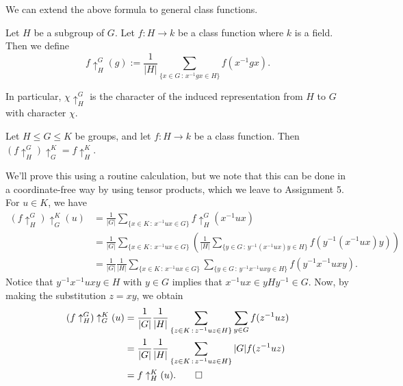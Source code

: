 We can extend the above formula to general class functions. 

\begin{defn}{}
    Let $H$ be a subgroup of $G$. Let $f : H \to k$ be a class function 
    where $k$ is a field. Then we define 
    \[ f \uparrow_H^G(g) := \frac{1}{|H|} \sum_{\{x\in G\,:\,x^{-1}gx \in H\}} 
    f(x^{-1}gx). \] 
\end{defn}

In particular, $\chi \uparrow_H^G$ is the character of the induced representation
from $H$ to $G$ with character $\chi$. 

\begin{prop}{}
    Let $H \leq G \leq K$ be groups, and let $f : H \to k$ be a class function. 
    Then $(f \uparrow_H^G) \uparrow_G^K = f \uparrow_H^K$. 
\end{prop}
\begin{pf}
    We'll prove this using a routine calculation, but we note that this can be 
    done in a coordinate-free way by using tensor products, which we leave 
    to Assignment 5. For $u \in K$, we have 
    \begin{align*}
        (f \uparrow_H^G) \uparrow_G^K(u)
        &= \frac{1}{|G|} \sum_{\{x\in K\,:\,x^{-1}ux\in G\}} f \uparrow_H^G (x^{-1}ux) \\ 
        &= \frac{1}{|G|} \sum_{\{x\in K\,:\,x^{-1}ux\in G\}} \left( 
        \frac{1}{|H|} \sum_{\{y\in G\,:\,y^{-1}(x^{-1}ux)y\in H\}} f(y^{-1}(x^{-1}ux)y) \right) \\ 
        &= \frac{1}{|G|} \frac{1}{|H|} \sum_{\{x\in K\,:\,x^{-1}ux\in G\}}
        \sum_{\{y\in G\,:\,y^{-1}x^{-1}uxy\in H\}} f(y^{-1}x^{-1}uxy). 
    \end{align*}
    Notice that $y^{-1}x^{-1}uxy \in H$ with $y \in G$ implies that 
    $x^{-1}ux \in yHy^{-1} \in G$. Now, by making the substitution $z = xy$, 
    we obtain 
    \begin{align*}
        (f \uparrow_H^G) \uparrow_G^K(u)
        &= \frac{1}{|G|} \frac{1}{|H|} \sum_{\{z\in K\,:\,z^{-1}uz \in H\}} 
        \sum_{y \in G} f(z^{-1}uz) \\ 
        &= \frac{1}{|G|} \frac{1}{|H|} \sum_{\{z\in K\,:\,z^{-1}uz \in H\}} 
        |G| f(z^{-1}uz) \\ 
        &= f \uparrow_H^K(u). \qedhere 
    \end{align*}
\end{pf}
